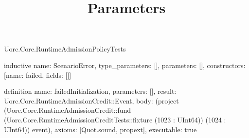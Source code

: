 \begin{lexlean}{Uorc.Core.RuntimeAdmissionPolicyTests}
\title{Parameters}
\begin{semanticmodule}
inductive{
  name: ScenarioError,
  type_parameters: [],
  parameters: [],
  constructors: [{name: failed, fields: []}]
}

definition{
  name: failedInitialization,
  parameters: [],
  result: Uorc.Core.RuntimeAdmissionCredit::Event,
  body: (project (Uorc.Core.RuntimeAdmissionCredit::fund (Uorc.Core.RuntimeAdmissionCreditTests::fixture (1023 : UInt64)) (1024 : UInt64)) event),
  axioms: [Quot.sound, propext],
  executable: true
}


\end{semanticmodule}
\end{lexlean}

